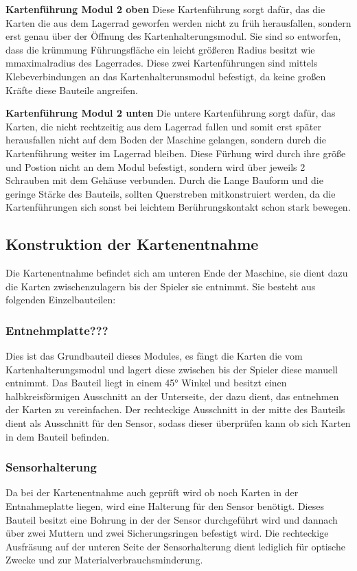 \textbf{Kartenführung Modul 2 oben}
Diese Kartenführung sorgt dafür, das die Karten die aus dem Lagerrad geworfen werden nicht zu früh herausfallen,
sondern erst genau über der Öffnung des Kartenhalterungsmodul. Sie sind so entworfen, dass die krümmung Führungsfläche ein leicht
größeren Radius besitzt wie mmaximalradius des Lagerrades. Diese zwei Kartenführungen sind mittels Klebeverbindungen
an das Kartenhalterunsmodul befestigt, da keine großen Kräfte diese Bauteile angreifen.

\textbf{Kartenführung Modul 2 unten}
Die untere Kartenführung sorgt dafür, das Karten, die nicht rechtzeitig aus dem Lagerrad fallen und somit erst später
herausfallen nicht auf dem Boden der Maschine gelangen, sondern durch die Kartenführung weiter im Lagerrad bleiben. Diese Fürhung
wird durch ihre größe und Postion nicht an dem Modul befestigt, sondern wird über jeweils 2 Schrauben mit dem Gehäuse
verbunden. Durch die Lange Bauform und die geringe Stärke des Bauteils, sollten Querstreben mitkonstruiert werden,
da die Kartenführungen sich sonst bei leichtem Berührungskontakt schon stark bewegen.

\subsection{Konstruktion der Kartenentnahme}
Die Kartenentnahme befindet sich am unteren Ende der Maschine, sie dient dazu die Karten zwischenzulagern bis der Spieler
sie entnimmt. Sie besteht aus folgenden Einzelbauteilen:

\subsubsection{Entnehmplatte???}
Dies ist das Grundbauteil dieses Modules, es fängt  die Karten die vom Kartenhalterungsmodul und lagert diese zwischen bis
der Spieler diese manuell entnimmt. Das Bauteil liegt in einem 45° Winkel und besitzt einen halbkreisförmigen Ausschnitt
an der Unterseite, der dazu dient, das entnehmen der Karten zu vereinfachen. Der rechteckige Ausschnitt in der mitte des
Bauteils dient als Ausschnitt für den Sensor, sodass dieser überprüfen kann ob sich Karten in dem Bauteil befinden.

\subsubsection{Sensorhalterung}
Da bei der Kartenentnahme auch geprüft wird ob noch Karten in der Entnahmeplatte liegen, wird eine Halterung für den
Sensor benötigt. Dieses Bauteil besitzt eine Bohrung in der der Sensor durchgeführt wird und dannach über zwei Muttern und
zwei Sicherungsringen befestigt wird. Die rechteckige Ausfräsung auf der unteren Seite der Sensorhalterung dient lediglich
für optische Zwecke und zur Materialverbrauchsminderung.

